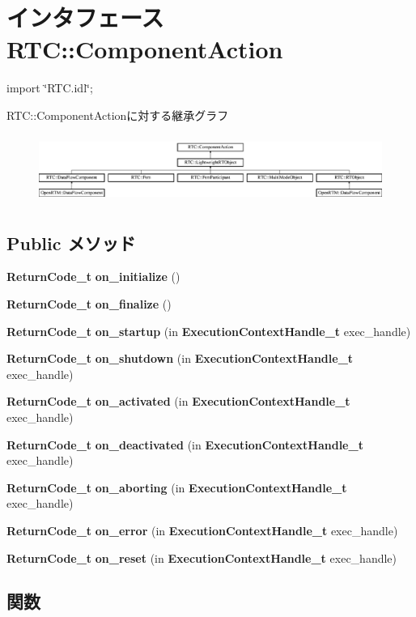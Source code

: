 \section{インタフェース RTC::ComponentAction}
\label{interfaceRTC_1_1ComponentAction}


{\ttfamily import \char`\"{}RTC.idl\char`\"{};}

RTC::ComponentActionに対する継承グラフ\begin{figure}[H]
\begin{center}
\leavevmode
\includegraphics[height=2.25126cm]{interfaceRTC_1_1ComponentAction}
\end{center}
\end{figure}
\subsection*{Public メソッド}
\begin{DoxyCompactItemize}
\item 
{\bf ReturnCode\_\-t} {\bf on\_\-initialize} ()
\item 
{\bf ReturnCode\_\-t} {\bf on\_\-finalize} ()
\item 
{\bf ReturnCode\_\-t} {\bf on\_\-startup} (in {\bf ExecutionContextHandle\_\-t} exec\_\-handle)
\item 
{\bf ReturnCode\_\-t} {\bf on\_\-shutdown} (in {\bf ExecutionContextHandle\_\-t} exec\_\-handle)
\item 
{\bf ReturnCode\_\-t} {\bf on\_\-activated} (in {\bf ExecutionContextHandle\_\-t} exec\_\-handle)
\item 
{\bf ReturnCode\_\-t} {\bf on\_\-deactivated} (in {\bf ExecutionContextHandle\_\-t} exec\_\-handle)
\item 
{\bf ReturnCode\_\-t} {\bf on\_\-aborting} (in {\bf ExecutionContextHandle\_\-t} exec\_\-handle)
\item 
{\bf ReturnCode\_\-t} {\bf on\_\-error} (in {\bf ExecutionContextHandle\_\-t} exec\_\-handle)
\item 
{\bf ReturnCode\_\-t} {\bf on\_\-reset} (in {\bf ExecutionContextHandle\_\-t} exec\_\-handle)
\end{DoxyCompactItemize}


\subsection{関数}
